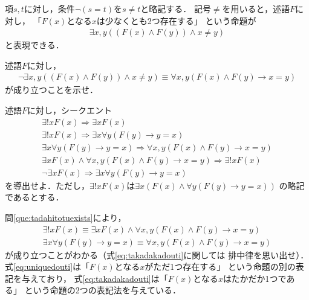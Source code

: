      項$s,  t$に対し，条件$\lnot(s=t)$を$s \neq t$と略記する．
     記号$\neq$を用いると，述語$F$に対し，
     「$F(x)$となる$x$は少なくとも2つ存在する」
     という命題が
     \begin{align}
       \exists x, y ((F(x) \land F(y) ) \land x \neq y)
       \label{eq:2tusonzai}
     \end{align}
     と表現できる．
     \begin{que} \label{que:2tusonzaihitei}
       述語$F$に対し，
       \begin{align*}
         \lnot \exists x,y ((F(x) \land F(y)) \land x \neq y)
         \equiv \forall x,y (F(x) \land F(y)  \to x=y)
       \end{align*}
       が成り立つことを示せ．
     \end{que}
     \begin{que} \label{que:tadahitotuexists}
       述語$F$に対し，シークエント
       \begin{align}
         \exists ! x F(x)
         \Longrightarrow \exists x F(x)
         \label{eq:existsunique} \\
         \exists ! x F(x)
         \Longrightarrow \exists x \forall y ( F(y) \to y=x )
         \label{eq:existstenceunique} \\
         \exists x \forall y (F(y) \to y=x ) \Longrightarrow 
         \forall x, y (F(x) \land F(y) \to x=y)
         \label{eq:uniquetakadaka} \\
         \exists x F(x) \land \forall x,y (F(x) \land F(y) \to x=y) 
         \Longrightarrow \exists ! x F(x)
         \label{eq:takadakaunique} \\
         \lnot \exists x F(x) \Longrightarrow \exists x \forall y (F(y) \to y=x)
         \label{eq:lnottakadaka}
       \end{align}
       を導出せよ．ただし，$\exists ! x F(x)$は$\exists x (F(x) \land \forall y (F(y) \to y=x))$
       の略記であるとする．
     \end{que}

     問\ref{que:tadahitotuexists}により，
     \begin{align}
       \exists ! x F(x) \equiv \exists x F(x) \land \forall x, y (F(x)\land F(y) \to x=y)
       \label{eq:uniquedouti} \\
       \exists x \forall y (F(y) \to y=x) \equiv \forall x, y (F(x) \land F(y) \to x=y)
       \label{eq:takadakadouti}
     \end{align}
     が成り立つことがわかる（式\eqref{eq:takadakadouti}に関しては
     排中律を思い出せ）．
     式\eqref{eq:uniquedouti}は「$F(x)$となる$x$がただ1つ存在する」
     という命題の別の表記を与えており，
     式\eqref{eq:takadakadouti}は「$F(x)$となる$x$はたかだか1つである」
     という命題の2つの表記法を与えている．
